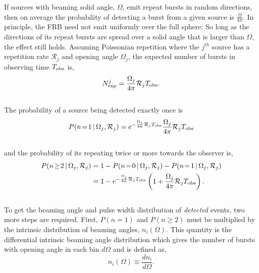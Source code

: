 \documentclass[fleqn,usenatbib]{mnras}
\begin{document}
If sources with beaming solid angle, $\Omega$,
emit repeat bursts in random directions, then on average 
the probability of detecting a burst from a given source is $\frac{\Omega}{4\pi}$. 
In principle, the FRB need not emit uniformly over the full sphere: So long as the directions of its repeat bursts are spread over a solid angle that is larger than $\Omega$, the effect 
still holds. Assuming Poissonian repetition where the $j^{th}$ source has a repetition rate $\mathcal{R}_j$ and opening angle $\Omega_j$, the expected number of bursts in 
observing time $T_{\rm obs}$ is,
\\
\begin{equation}
    N^j_{\rm exp} = \frac{\Omega_j}{4\pi} \mathcal{R}_j T_{\rm obs}.
\end{equation}
\\
\noindent The probability of a source being detected exactly once is
\\
\begin{align}
    P(n\!=\!1\,|\,\Omega_j, \mathcal{R}_j) = 
    e^{-\frac{\Omega_j}{4\pi}\mathcal{R}_j T_{\rm obs}}\frac{\Omega_j}{4\pi}\mathcal{R}_j T_{\rm obs}
    \label{eq-p1}
\end{align}
\\
\noindent and the probability of its repeating twice or more towards the 
observer is,
\\
\begin{align}
    P(n\!\geq\!2\,|\,\Omega_j, \mathcal{R}_j) &= 1 - P(n\!=\!0\,|\, \Omega_j, \mathcal{R}_j) - P(n\!=\!1\,|\, \Omega_j, \mathcal{R}_j)\\
    &= 1 - e^{-\frac{\Omega_j}{4\pi}\mathcal{R}_jT_{\rm obs}}\left (1 + \frac{\Omega_j}{4\pi}\mathcal{R}_jT_{\rm obs}
    \right ).
\end{align}
\\
\noindent To get the beaming angle and pulse width distribution of \textit{detected} events, two more steps are required. 
First, $P(n\!=\!1)$ and $P(n\!\geq\!2)$ must be multiplied by the intrinsic distribution of 
beaming angles, $n_i(\Omega)$. This quantity is the
differential intrinsic beaming angle distribution which 
gives the number of bursts with opening 
angle in each bin $d\Omega$ and is defined as,
\\
\begin{equation}
    n_i(\Omega) \equiv \frac{dn_i}{d\Omega}.
\end{equation}
\end{document}
